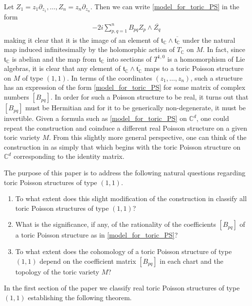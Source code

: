 \documentclass[pdftex]{sigma}
\numberwithin{equation}{section}
\begin{document}
Let $Z_1=z_1\partial_{z_1},\dots,Z_n=z_n\partial_{z_n}$. Then we can write \eqref{model_for_toric_PS} in the form
\begin{gather*}
-2i\sum_{p,q=1}^n B_{pq} Z_p\wedge\overline{Z_q}
\end{gather*}
making it clear that it is the image of an element of ${\mathfrak t}_{\mathbb C}\wedge \overline{{\mathfrak t}_{\mathbb C}}$ under the natural map induced inf\/initesimally by the holomorphic action of $T_{\mathbb C}$ on $M$. In fact, since ${\mathfrak t}_{\mathbb C}$ is abelian and the map from ${\mathfrak t}_{\mathbb C}$ into sections of $T^{1,0}$ is a homomorphism of Lie algebras, it is clear that any element of ${\mathfrak t}_{\mathbb C}\wedge \overline{{\mathfrak t}_{\mathbb C}}$ maps to a toric Poisson structure on $M$ of type $(1,1)$. In terms of the coordinates $(z_1,\dots,z_n)$, such a structure has an expression of the form \eqref{model_for_toric_PS} for some matrix of complex numbers $[B_{pq}]$. In order for such a Poisson structure to be real, it turns out that $[B_{pq}]$ must be Hermitian and for it to be generically non-degenerate, it must be invertible. Given a formula such as \eqref{model_for_toric_PS} on ${\mathbb C}^d$, one could repeat the construction and coinduce a dif\/ferent real Poisson structure on a given toric variety $M$. From this slightly more general perspective, one can think of the construction in \cite{Caine} as simply that which begins with the toric Poisson structure on ${\mathbb C}^d$ corresponding to the identity matrix.

The purpose of this paper is to address the following natural questions regarding toric Poisson structures of type $(1,1)$.
\begin{enumerate}\itemsep=0pt
\item To what extent does this slight modif\/ication of the construction in \cite{Caine} classify all toric Poisson structures of type $(1,1)$?
\item What is the signif\/icance, if any, of the rationality of the coef\/f\/icients $[B_{pq}]$ of a toric Poisson structure as in \eqref{model_for_toric_PS}?
\item To what extent does the cohomology of a toric Poisson structure of type $(1,1)$ depend on the coef\/f\/icient matrix $[B_{pq}]$ in each chart and the topology of the toric variety $M$?
\end{enumerate}
In the f\/irst section of the paper we classify real toric Poisson structures of type $(1,1)$ establishing the following theorem.
\end{document}
